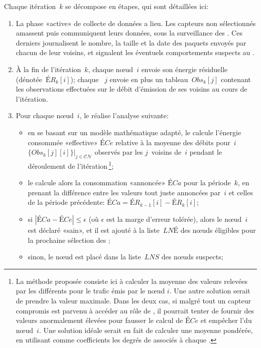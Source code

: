 Chaque itération~$k$ se décompose en étapes, qui sont détaillées ici:
\begin{enumerate}
    \item La phase «active» de collecte de données a lieu. Les capteurs non sélectionnés amassent puis communiquent leurs données, sous la surveillance des \cns. Ces derniers journalisent le nombre, la taille et la date des paquets envoyés par chacun de leur voisins, et signalent les éventuels comportements suspects au \ch.
    \item À la fin de l'itération~$k$, chaque nœud~$i$ envoie son énergie résiduelle (dénotée~$\mathit{ÉR}_k[i]$); chaque \cn~$j$ envoie en plus un tableau~$\mathit{Obs}_k[j]$ contenant les observations effectuées sur le débit d'émission de ses voisins au cours de l'itération.
    \item Pour chaque nœud~$i$, le \ch réalise l'analyse suivante:
        \begin{itemize}
            \item en se basant sur un modèle mathématique adapté, le \CH calcule l'énergie consommée «effective» $\mathit{ÉCe}$ relative à la moyenne des débits pour~$i$ $\{\mathit{Obs}_k[j][i]\}|_{j\in \mathcal{CN}}$ observés par les $j$~\cns voisins de~$i$ pendant le déroulement de l'itération\,\footnote{La méthode proposée consiste ici à calculer la moyenne des valeurs relevées par les différents \cns pour le trafic émis par le nœud $i$. Une autre solution serait de prendre la valeur maximale. Dans les deux cas, si malgré tout un capteur compromis est parvenu à accéder au rôle de \cn, il pourrait tenter de fournir des valeurs anormalement élevées pour fausser le calcul de $\mathit{ÉCe}$ et empêcher l'\election du nœud~$i$. Une solution idéale serait en fait de calculer une moyenne pondérée, en utilisant comme coefficients les degrés de  associés à chaque \cn.};
            \item le \CH calcule alors la consommation «annoncée» $\mathit{ÉCa}$ pour la période~$k$, en prenant la différence entre les valeurs tout juste annoncées par~$i$ et celles de la période précédente: $\mathit{ÉCa}=\mathit{ÉR}_{k-1}[i] - \mathit{ÉR}_k[i]$;
            \item si $|\mathit{ÉCa}-\mathit{ÉCe}|\leq\epsilon$ (où $\epsilon$ est la marge d'erreur tolérée), alors le nœud~$i$ est déclaré «sain», et il est ajouté à la liste~$\mathit{LNÉ}$ des nœuds éligibles pour la prochaine sélection des \cns;
            \item sinon, le nœud est placé dans la liste~$\mathit{LNS}$ des nœuds suspects;

\end{itemize}
\end{enumerate}
